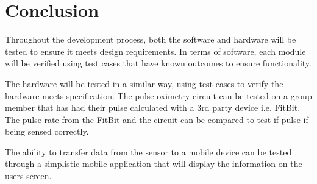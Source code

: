 \section{Conclusion}

Throughout the development process, both the software and hardware will be tested to ensure it meets design requirements. In terms of software, each module will be verified using test cases that have known outcomes to ensure functionality. 

The hardware will be tested in a similar way, using test cases to verify the hardware meets specification. The pulse oximetry circuit can be tested on a group member that has had their pulse calculated with a 3rd party device i.e. FitBit. The pulse rate from the FitBit and the circuit can be compared to test if pulse if being sensed correctly. 

The ability to transfer data from the sensor to a mobile device can be tested through a simplistic mobile application that will display the information on the users screen. 

